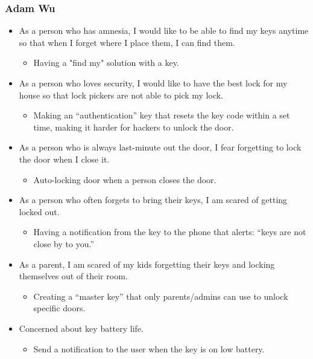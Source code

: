 \subsubsection*{Adam Wu}
\begin{itemize}
    \item As a person who has amnesia, I would like to be able to find my keys anytime so that when I forget where I place them, I can find them.
    \begin{itemize}
        \item Having a "find my" solution with a key.
    \end{itemize}
    \item As a person who loves security, I would like to have the best lock for my house so that lock pickers are not able to pick my lock.
    \begin{itemize}
        \item Making an “authentication” key that resets the key code within a set time, making it harder for hackers to unlock the door.
    \end{itemize}
    \item As a person who is always last-minute out the door, I fear forgetting to lock the door when I close it.
    \begin{itemize}
        \item Auto-locking door when a person closes the door.
    \end{itemize}
    \item As a person who often forgets to bring their keys, I am scared of getting locked out.
    \begin{itemize}
        \item Having a notification from the key to the phone that alerts: “keys are not close by to you.”
    \end{itemize}
    \item As a parent, I am scared of my kids forgetting their keys and locking themselves out of their room.
    \begin{itemize}
        \item Creating a “master key” that only parents/admins can use to unlock specific doors.
    \end{itemize}
    \item Concerned about key battery life.
    \begin{itemize}
        \item Send a notification to the user when the key is on low battery.
    \end{itemize}
\end{itemize}

